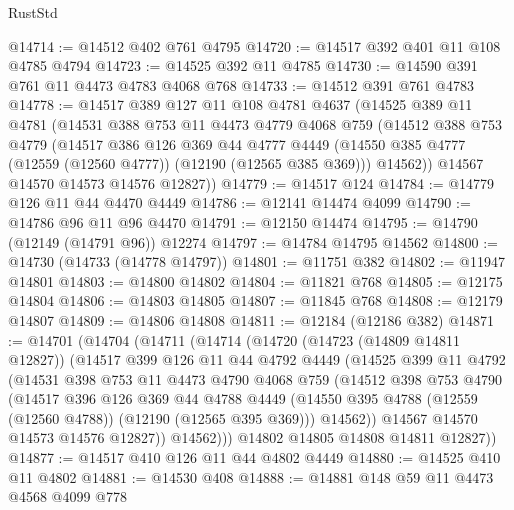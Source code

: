 \begin{lexlean}{RustStd}
\begin{coremodule}
@14714 := @14512 @402 @761 @4795
@14720 := @14517 @392 @401 @11 @108 @4785 @4794
@14723 := @14525 @392 @11 @4785
@14730 := @14590 @391 @761 @11 @4473 @4783 @4068 @768
@14733 := @14512 @391 @761 @4783
@14778 := @14517
    @389
    @127
    @11
    @108
    @4781
    @4637
    (@14525
      @389
      @11
      @4781
      (@14531
        @388
        @753
        @11
        @4473
        @4779
        @4068
        @759
        (@14512
          @388
          @753
          @4779
          (@14517
            @386
            @126
            @369
            @44
            @4777
            @4449
            (@14550 @385 @4777 (@12559 (@12560 @4777)) (@12190 (@12565 @385 @369)))
            @14562))
        @14567
        @14570
        @14573
        @14576
        @12827))
@14779 := @14517 @124
@14784 := @14779 @126 @11 @44 @4470 @4449
@14786 := @12141 @14474 @4099
@14790 := @14786 @96 @11 @96 @4470
@14791 := @12150 @14474
@14795 := @14790 (@12149 (@14791 @96)) @12274
@14797 := @14784 @14795 @14562
@14800 := @14730 (@14733 (@14778 @14797))
@14801 := @11751 @382
@14802 := @11947 @14801
@14803 := @14800 @14802
@14804 := @11821 @768
@14805 := @12175 @14804
@14806 := @14803 @14805
@14807 := @11845 @768
@14808 := @12179 @14807
@14809 := @14806 @14808
@14811 := @12184 (@12186 @382)
@14871 := @14701
    (@14704
      (@14711
        (@14714
          (@14720
            (@14723 (@14809 @14811 @12827))
            (@14517
              @399
              @126
              @11
              @44
              @4792
              @4449
              (@14525
                @399
                @11
                @4792
                (@14531
                  @398
                  @753
                  @11
                  @4473
                  @4790
                  @4068
                  @759
                  (@14512
                    @398
                    @753
                    @4790
                    (@14517
                      @396
                      @126
                      @369
                      @44
                      @4788
                      @4449
                      (@14550 @395 @4788 (@12559 (@12560 @4788)) (@12190 (@12565 @395 @369)))
                      @14562))
                  @14567
                  @14570
                  @14573
                  @14576
                  @12827))
              @14562)))
        @14802
        @14805
        @14808
        @14811
        @12827))
@14877 := @14517 @410 @126 @11 @44 @4802 @4449
@14880 := @14525 @410 @11 @4802
@14881 := @14530 @408
@14888 := @14881 @148 @59 @11 @4473 @4568 @4099 @778

\end{coremodule}
\end{lexlean}
